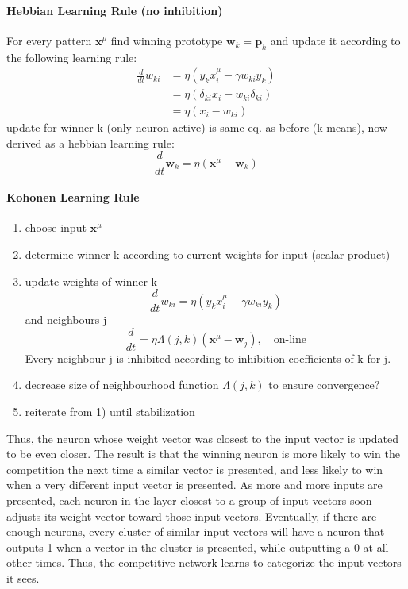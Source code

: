 \documentclass[11pt]{article}
\begin{document}
\paragraph{Hebbian Learning Rule (no inhibition)}
For every pattern $\mathbf{x}^\mu$ find winning prototype $\mathbf{w}_k=\mathbf{p}_k$ and update it according to the following learning rule:
\begin{align*}
\frac{d}{dt}w_{ki}&=\eta(y_k x_i^\mu-\gamma w_{ki}y_k)\\
&=\eta(\delta_{ki} x_i-w_{ki}\delta_{ki})\\
&=\eta(x_i-w_{ki})%
\end{align*}
update for winner k (only neuron active) is same eq. as before (k-means), now derived as a hebbian learning rule:
\[
\frac{d}{dt} \mathbf{w}_{k}=\eta(\mathbf{x}^\mu-\mathbf{w}_{k})
\]

\paragraph{Kohonen Learning Rule}
\begin{enumerate}
\item choose input $\mathbf{x}^\mu$
\item determine winner k according to current weights for input (scalar product)
\item update weights of winner k \[
\frac{d}{dt} w_{ki}=\eta(y_kx_i^\mu-\gamma w_{ki}y_k)
\]
and neighbours j
\[
\frac{d}{dt} = \eta \Lambda(j,k)(\mathbf{x}^\mu-\mathbf{w}_j),\quad \text{on-line}
\] Every neighbour j is inhibited according to inhibition coefficients of k for j.
\item decrease size of neighbourhood function $\Lambda(j,k)$ to ensure convergence?
\item reiterate from 1) until stabilization
\end{enumerate}
Thus, the neuron whose weight vector was closest to the input vector is updated to be even closer. The result is that the winning neuron is more likely to win the competition the next time a similar vector is presented, and less likely to win when a very different input vector is presented. As more and more inputs are presented, each neuron in the layer closest to a group of input vectors soon adjusts its weight vector toward those input vectors. Eventually, if there are enough neurons, every cluster of similar input vectors will have a neuron that outputs 1 when a vector in the cluster is presented, while outputting a 0 at all other times. Thus, the competitive network learns to categorize the input vectors it sees.
\end{document}
